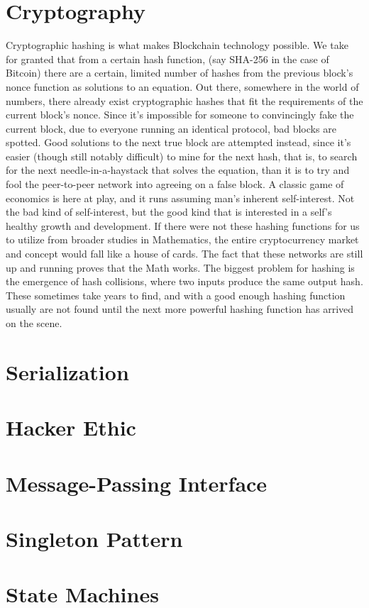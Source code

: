 \documentclass[10pt,a4paper,leqno,bibliography=totoc]{scrartcl}
\newenvironment{alphafootnotes}
{\par\edef\savedfootnotenumber{\number\value{footnote}}
\renewcommand{\thefootnote}{\alph{footnote}}
\setcounter{footnote}{0}}
{\par\setcounter{footnote}{\savedfootnotenumber}}
\begin{document}
\begin{alphafootnotes}
\begin{multicols*}{2}
	\section{Cryptography} Cryptographic hashing is what makes Blockchain technology possible. We take for granted that from a certain hash function, (say SHA-256 in the case of Bitcoin) there are a certain, limited number of hashes from the previous block's nonce function as solutions to an equation. Out there, somewhere in the world of numbers, there already exist cryptographic hashes that fit the requirements of the current block's nonce. Since it's impossible for someone to convincingly fake the current block, due to everyone running an identical protocol, bad blocks are spotted. Good solutions to the next true block are attempted instead, since it's easier (though still notably difficult)  to mine for the next hash, that is, to search for the next needle-in-a-haystack that solves the equation, than it is to try and fool the peer-to-peer network into agreeing on a false block. A classic game of economics is here at play, and it runs assuming man's inherent self-interest. Not the bad kind of self-interest, but the good kind that is interested in a self's healthy growth and development. If there were not these hashing functions for us to utilize from broader studies in Mathematics, the entire cryptocurrency market and concept would fall like a house of cards. The fact that these networks are still up and running proves that the Math works. The biggest problem for hashing is the emergence of hash collisions, where two inputs produce the same output hash. These sometimes take years to find, and with a good enough hashing function usually are not found until the next more powerful hashing function has arrived on the scene.
	\section{Serialization}
	\section{Hacker Ethic}
	\section{Message-Passing Interface}
	\section{Singleton Pattern}
	\section{State Machines}

\end{multicols*}
\end{alphafootnotes}
\end{document}
